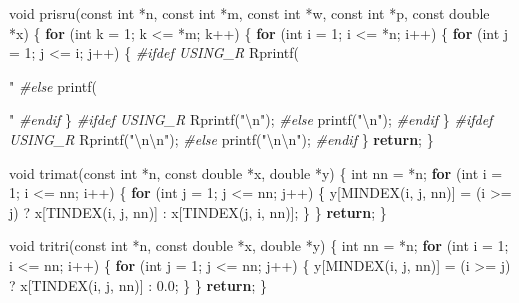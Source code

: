 \documentclass[12pt,]{article}
\newenvironment{Shaded}{\begin{snugshade}}{\end{snugshade}}
\newcommand{\ControlFlowTok}[1]{\textcolor[rgb]{0.13,0.29,0.53}{\textbf{#1}}}
\newcommand{\DataTypeTok}[1]{\textcolor[rgb]{0.13,0.29,0.53}{#1}}
\newcommand{\DecValTok}[1]{\textcolor[rgb]{0.00,0.00,0.81}{#1}}
\newcommand{\FloatTok}[1]{\textcolor[rgb]{0.00,0.00,0.81}{#1}}
\newcommand{\NormalTok}[1]{#1}
\newcommand{\PreprocessorTok}[1]{\textcolor[rgb]{0.56,0.35,0.01}{\textit{#1}}}
\newcommand{\SpecialCharTok}[1]{\textcolor[rgb]{0.00,0.00,0.00}{#1}}
\newcommand{\StringTok}[1]{\textcolor[rgb]{0.31,0.60,0.02}{#1}}
\begin{document}
\begin{Shaded}
\begin{Highlighting}[]
{{{{\DataTypeTok{void}\NormalTok{ prisru(}\DataTypeTok{const} \DataTypeTok{int}\NormalTok{ *n, }\DataTypeTok{const} \DataTypeTok{int}\NormalTok{ *m, }\DataTypeTok{const} \DataTypeTok{int}\NormalTok{ *w, }\DataTypeTok{const} \DataTypeTok{int}\NormalTok{ *p,}
            \DataTypeTok{const} \DataTypeTok{double}\NormalTok{ *x) \{}
  \ControlFlowTok{for}\NormalTok{ (}\DataTypeTok{int}\NormalTok{ k = }\DecValTok{1}\NormalTok{; k <= *m; k++) \{}
    \ControlFlowTok{for}\NormalTok{ (}\DataTypeTok{int}\NormalTok{ i = }\DecValTok{1}\NormalTok{; i <= *n; i++) \{}
      \ControlFlowTok{for}\NormalTok{ (}\DataTypeTok{int}\NormalTok{ j = }\DecValTok{1}\NormalTok{; j <= i; j++) \{}
\PreprocessorTok{#ifdef USING_R}
\NormalTok{        Rprintf(}\StringTok{" %
\PreprocessorTok{#else}
\NormalTok{        printf(}\StringTok{" %
\PreprocessorTok{#endif}
\NormalTok{      \}}
\PreprocessorTok{#ifdef USING_R}
\NormalTok{      Rprintf(}\StringTok{"}\SpecialCharTok{\textbackslash{}n}\StringTok{"}\NormalTok{);}
\PreprocessorTok{#else}
\NormalTok{      printf(}\StringTok{"}\SpecialCharTok{\textbackslash{}n}\StringTok{"}\NormalTok{);}
\PreprocessorTok{#endif}
\NormalTok{    \}}
\PreprocessorTok{#ifdef USING_R}
\NormalTok{    Rprintf(}\StringTok{"}\SpecialCharTok{\textbackslash{}n\textbackslash{}n}\StringTok{"}\NormalTok{);}
\PreprocessorTok{#else}
\NormalTok{    printf(}\StringTok{"}\SpecialCharTok{\textbackslash{}n\textbackslash{}n}\StringTok{"}\NormalTok{);}
\PreprocessorTok{#endif}
\NormalTok{  \}}
  \ControlFlowTok{return}\NormalTok{;}
\NormalTok{\}}

\DataTypeTok{void}\NormalTok{ trimat(}\DataTypeTok{const} \DataTypeTok{int}\NormalTok{ *n, }\DataTypeTok{const} \DataTypeTok{double}\NormalTok{ *x, }\DataTypeTok{double}\NormalTok{ *y) \{}
  \DataTypeTok{int}\NormalTok{ nn = *n;}
  \ControlFlowTok{for}\NormalTok{ (}\DataTypeTok{int}\NormalTok{ i = }\DecValTok{1}\NormalTok{; i <= nn; i++) \{}
    \ControlFlowTok{for}\NormalTok{ (}\DataTypeTok{int}\NormalTok{ j = }\DecValTok{1}\NormalTok{; j <= nn; j++) \{}
\NormalTok{      y[MINDEX(i, j, nn)] =}
\NormalTok{          (i >= j) ? x[TINDEX(i, j, nn)] : x[TINDEX(j, i, nn)];}
\NormalTok{    \}}
\NormalTok{  \}}
  \ControlFlowTok{return}\NormalTok{;}
\NormalTok{\}}

\DataTypeTok{void}\NormalTok{ tritri(}\DataTypeTok{const} \DataTypeTok{int}\NormalTok{ *n, }\DataTypeTok{const} \DataTypeTok{double}\NormalTok{ *x, }\DataTypeTok{double}\NormalTok{ *y) \{}
  \DataTypeTok{int}\NormalTok{ nn = *n;}
  \ControlFlowTok{for}\NormalTok{ (}\DataTypeTok{int}\NormalTok{ i = }\DecValTok{1}\NormalTok{; i <= nn; i++) \{}
    \ControlFlowTok{for}\NormalTok{ (}\DataTypeTok{int}\NormalTok{ j = }\DecValTok{1}\NormalTok{; j <= nn; j++) \{}
\NormalTok{      y[MINDEX(i, j, nn)] = (i >= j) ? x[TINDEX(i, j, nn)] : }\FloatTok{0.0}\NormalTok{;}
\NormalTok{    \}}
\NormalTok{  \}}
  \ControlFlowTok{return}\NormalTok{;}
\NormalTok{\}}

}}}}}}
\end{Highlighting}
\end{Shaded}
\end{document}
